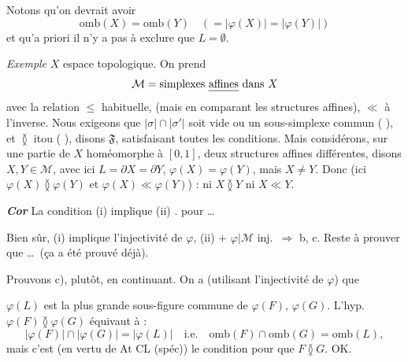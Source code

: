 \documentclass[11pt,a4paper]{article}
\begin{document}
Notons qu'on \struck{\ill{}} devrait avoir 
\[
  \mathrm{omb}(X) = \mathrm{omb}(Y) \quad (= |\varphi(X)| = |\varphi(Y)|)
\]
et qu'a priori il n'y a pas à exclure que $L = \emptyset$.

\emph{Exemple} $X$ espace topologique. On prend \struck{\ill{}}
\[
  \mathcal{M} = \text{simplexes \emph{affines} dans } X
\]
avec la relation $\leq$ habituelle,  (mais en comparant les structures affines), $\ll$ à l'inverse. Nous exigeons que $|\sigma| \cap |\sigma'|$ soit vide ou un sous-simplexe commun (\ill{} \ill{}), et $\between$ itou (\ill{} \ill{} \ill{}), disons $\mathfrak{F}$, satisfaisant toutes les conditions. Mais considérons, sur une partie de $X$ homéomorphe à $[0, 1]$, deux structures affines différentes, disons $X, Y \in \mathcal{M}$, \struck{\ill{}} avec ici $L = \partial X = \partial Y$, $\varphi(X) = \varphi(Y)$, mais $X \neq Y$. Donc (ici $\varphi(X) \between \varphi(Y)$ et $\varphi(X) \ll \varphi(Y)$)   : ni $X \between Y$ ni $X \ll Y$.

\textbf{\emph{Cor}} La condition (i) implique (ii) .   pour \ldots
{}

Bien sûr, (i) implique l'injectivité de $\varphi$, (ii) + $\varphi | \mathcal{M}$ inj.\ $\Longrightarrow$ b, c. Reste à prouver que \ldots\ (ça a été prouvé déjà).

Prouvons c), plutôt, en continuant. On a (utilisant l'injectivité de $\varphi$) que

$\varphi(L)$ est la plus grande sous-figure commune de $\varphi(F)$, $\varphi(G)$. L'hyp.\ $\varphi(F) \between \varphi(G)$ équivaut à :
\[
  |\varphi(F)| \cap |\varphi(G)| = |\varphi(L)| \quad \text{i.e.} \quad \mathrm{omb}(F) \cap \mathrm{omb}(G) = \mathrm{omb}(L) ,
\]
mais c'est (en vertu de At CL (spéc)) le condition pour que $F \between G$. OK.
\end{document}
